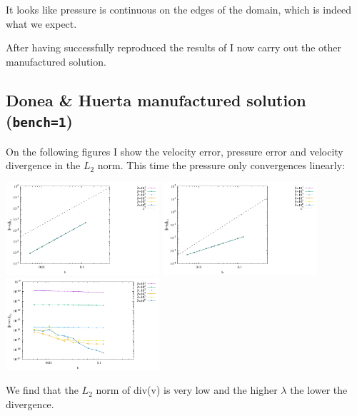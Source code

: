 It looks like pressure is continuous on the edges of the domain, 
which is indeed what we expect.

After having successfully reproduced the results of \textcite{huzh11}
I now carry out the other manufactured solution.

\subsection*{Donea \& Huerta manufactured solution ({\tt bench=1})}

On the following figures I show the velocity error, pressure error and velocity 
divergence in the $L_2$ norm.
This time the pressure only convergences linearly:

\begin{center}
\includegraphics[width=5.7cm]{python_codes/fieldstone_161/results/bench1/errorsV.pdf}
\includegraphics[width=5.7cm]{python_codes/fieldstone_161/results/bench1/errorsP.pdf}
\includegraphics[width=5.7cm]{python_codes/fieldstone_161/results/bench1/errorsDivv.pdf}
\end{center}

We find that the $L_2$ norm of div(v) is very low and the higher $\lambda$ the lower 
the divergence.

